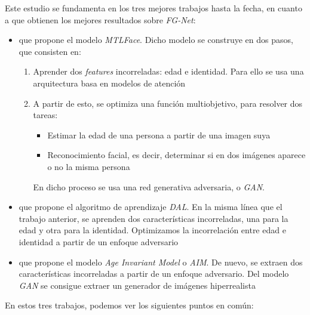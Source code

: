 Este estudio se fundamenta en los tres mejores trabajos hasta la fecha, en cuanto a que obtienen los mejores resultados sobre \textit{FG-Net}:

\begin{itemize}
    \item {} \cite{informatica:best_fgnet_model} que propone el modelo \textit{MTLFace}. Dicho modelo se construye en dos pasos, que consisten en:
        \begin{enumerate}
            \item Aprender dos \textit{features} incorreladas: edad e identidad. Para ello se usa una arquitectura basa en modelos de atención
            \item A partir de esto, se optimiza una función multiobjetivo, para resolver dos tareas:
                    \begin{itemize}
                        \item Estimar la edad de una persona a partir de una imagen suya
                        \item Reconocimiento facial, es decir, determinar si en dos imágenes aparece o no la misma persona
                    \end{itemize}
            En dicho proceso se usa una red generativa adversaria, o \textit{GAN}.
        \end{enumerate}
    \item {} \cite{informatica:dal} que propone el algoritmo de aprendizaje \textit{DAL}. En la misma línea que el trabajo anterior, se aprenden dos características incorreladas, una para la edad y otra para la identidad. Optimizamos la incorrelación entre edad e identidad a partir de un enfoque adversario
    \item {} \cite{informatica:aim} que propone el modelo \textit{Age Invariant Model} o \textit{AIM}. De nuevo, se extraen dos características incorreladas a partir de un enfoque adversario. Del modelo \textit{GAN} se consigue extraer un generador de imágenes hiperrealista
\end{itemize}

En estos tres trabajos, podemos ver los siguientes puntos en común:

